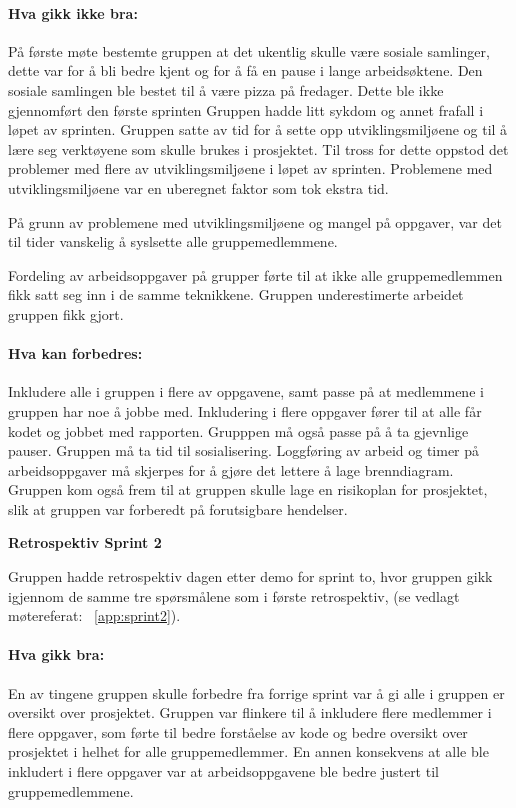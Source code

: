 \documentclass[12pt,a4paper,norsk]{article}
\begin{document}
\paragraph{Hva gikk ikke bra:}
På første møte bestemte gruppen at det ukentlig skulle være sosiale samlinger, dette var for å bli bedre kjent og for å få en pause i lange arbeidsøktene. Den sosiale samlingen ble bestet til å være pizza på fredager. Dette ble ikke gjennomført den første sprinten
Gruppen hadde litt sykdom og annet frafall i løpet av sprinten.
Gruppen satte av tid for å sette opp utviklingsmiljøene og til å lære seg verktøyene som skulle brukes i prosjektet. Til tross for dette oppstod det problemer med flere av utviklingsmiljøene i løpet av sprinten. Problemene med utviklingsmiljøene var en uberegnet faktor som tok ekstra tid.

På grunn av problemene med utviklingsmiljøene og mangel på oppgaver, var det til tider vanskelig å syslsette alle gruppemedlemmene.

Fordeling av arbeidsoppgaver på grupper førte til at ikke alle gruppemedlemmen fikk satt seg inn i de samme teknikkene.
Gruppen underestimerte arbeidet gruppen fikk gjort.


\paragraph{Hva kan forbedres:}
Inkludere alle i gruppen i flere av oppgavene, samt passe på at medlemmene i gruppen har noe å jobbe med.
Inkludering i flere oppgaver fører til at alle får kodet og jobbet med rapporten.
Grupppen må også passe på å ta gjevnlige pauser.
Gruppen må ta tid til sosialisering.
Loggføring av arbeid og timer på arbeidsoppgaver må skjerpes for å gjøre det lettere å lage brenndiagram.
Gruppen kom også frem til at gruppen skulle lage en risikoplan for prosjektet, slik at gruppen var forberedt på forutsigbare hendelser.



\bigskip \noindent \textbf{Retrospektiv Sprint 2}
\par Gruppen hadde retrospektiv dagen etter demo for sprint to, hvor gruppen gikk igjennom de samme tre spørsmålene som i første retrospektiv, (se vedlagt møtereferat: ~\cref{app:sprint2}).

\paragraph{Hva gikk bra:}
En av tingene gruppen skulle forbedre fra forrige sprint var å gi alle i gruppen er oversikt over prosjektet. Gruppen var flinkere til å inkludere flere medlemmer i flere oppgaver, som førte til bedre forståelse av kode og bedre oversikt over prosjektet i helhet for alle gruppemedlemmer. En annen konsekvens at alle ble inkludert i flere oppgaver var at arbeidsoppgavene ble bedre justert til gruppemedlemmene.
\end{document}
